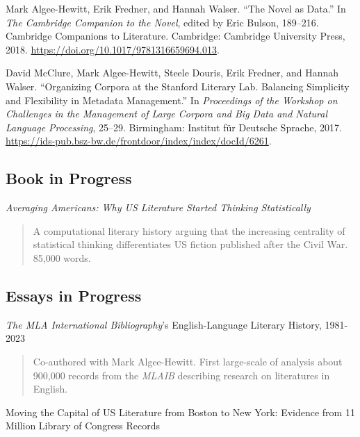 \documentclass[
  12pt,
  letterpaper,
]{article}
\newlength{\cslhangindent}
\newlength{\cslentryspacingunit} %
\newenvironment{CSLReferences}[2] %
 {%
  \setlength{\parindent}{0pt}
  \ifodd #1
  \let\oldpar\par
  \def\par{\hangindent=\cslhangindent\oldpar}
  \fi
  \setlength{\parskip}{#2\cslentryspacingunit}
 }%
 {}
\begin{document}
\begin{CSLReferences}{1}{0}
\leavevmode{}%
Mark Algee-Hewitt, Erik Fredner, and Hannah Walser. {``The {Novel} as
{Data}.''} In \emph{The {Cambridge Companion} to the {Novel}}, edited by
Eric Bulson, 189--216. Cambridge {Companions} to {Literature}.
{Cambridge}: {Cambridge University Press}, 2018.
\url{https://doi.org/10.1017/9781316659694.013}.

\leavevmode{}%
David McClure, Mark Algee-Hewitt, Steele Douris, Erik Fredner, and
Hannah Walser. {``Organizing Corpora at the {Stanford Literary Lab}.
{Balancing} Simplicity and Flexibility in Metadata Management.''} In
\emph{Proceedings of the {Workshop} on {Challenges} in the {Management}
of {Large Corpora} and {Big Data} and {Natural Language Processing}},
25--29. {Birmingham}: {Institut für Deutsche Sprache}, 2017.
\url{https://ids-pub.bsz-bw.de/frontdoor/index/index/docId/6261}.

\end{CSLReferences}

\hypertarget{book}{%
\subsection{Book in Progress}\label{book}}

\emph{Averaging Americans: Why US Literature Started Thinking Statistically}

\begin{quote}
A computational literary history arguing that the increasing centrality of statistical thinking differentiates US fiction published after the Civil War. 85,000 words.
\end{quote}

\hypertarget{wip}{%
\subsection{Essays in Progress}\label{wip}}

\emph{The MLA International Bibliography}'s English-Language Literary History, 1981-2023

\begin{quote}
Co-authored with Mark Algee-Hewitt. First large-scale of analysis about 900,000 records from the \emph{MLAIB} describing research on literatures in English.
\end{quote}

Moving the Capital of US Literature from Boston to New York: Evidence from 11 Million Library of Congress Records
\end{document}
